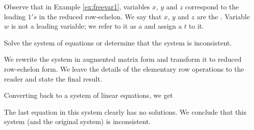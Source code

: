 \documentclass{ximera}
\begin{document}
Observe that in Example \ref{ex:freevar1}, variables $x$, $y$ and $z$ correspond to the leading $1's$ in the reduced row-echelon.  We say that $x$, $y$ and $z$ are the .  Variable $w$ is not a leading variable; we refer to it as a  and assign a  $t$ to it.

\begin{example}\label{ex:nosolutionssys}
Solve the system of equations or determine that the system is inconsistent.
    
    \begin{explanation}
    We rewrite the system in augmented matrix form and transform it to reduced row-echelon form.  We leave the details of the elementary row operations to the reader and state the final result.
    
    
 Converting back to a system of linear equations, we get
 
    The last equation in this system clearly has no solutions.  We conclude that this system (and the original system) is inconsistent.
    \end{explanation}
    
\end{example}
\end{document}
